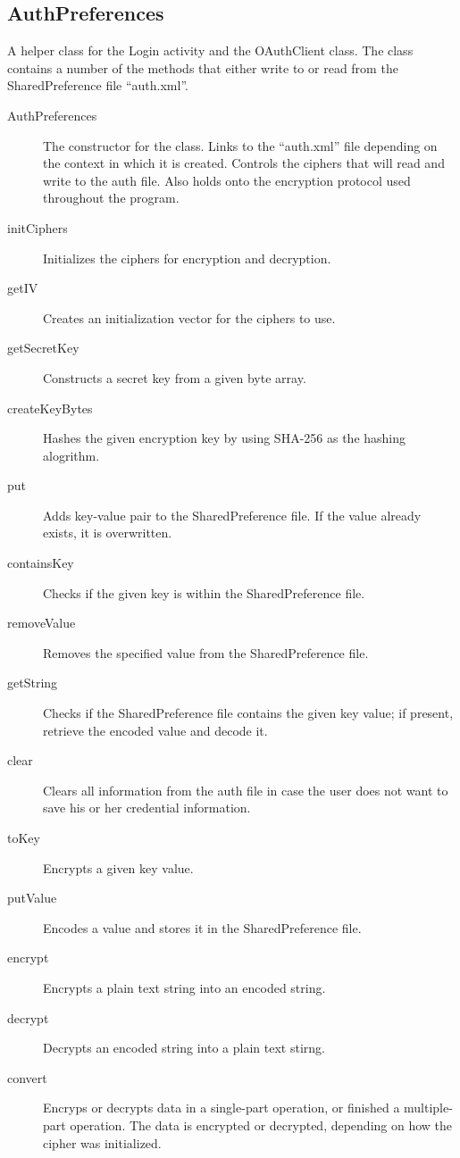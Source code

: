 \documentclass{article}
\begin{document}
\subsection{AuthPreferences}
A helper class for the Login activity and the OAuthClient class. The class contains a number of the methods that either write to or read from the SharedPreference file ``auth.xml''.
 \begin{description}
  \item[AuthPreferences] The constructor for the class. Links to the ``auth.xml'' file depending on the context in which it is created. Controls the ciphers that will read and write to the auth file. Also holds onto the encryption protocol used throughout the program.
  \item[initCiphers] Initializes the ciphers for encryption and decryption.
  \item[getIV] Creates an initialization vector for the ciphers to use.
  \item[getSecretKey] Constructs a secret key from a given byte array.
  \item[createKeyBytes] Hashes the given encryption key by using SHA-256 as the hashing alogrithm.
  \item[put] Adds key-value pair to the SharedPreference file. If the value already exists, it is overwritten.
  \item[containsKey] Checks if the given key is within the SharedPreference file.
  \item[removeValue] Removes the specified value from the SharedPreference file.
  \item[getString] Checks if the SharedPreference file contains the given key value; if present, retrieve the encoded value and decode it.
  \item[clear] Clears all information from the auth file in case the user does not want to save his or her credential information.
  \item[toKey] Encrypts a given key value.
  \item[putValue] Encodes a value and stores it in the SharedPreference file.
  \item[encrypt] Encrypts a plain text string into an encoded string.
  \item[decrypt] Decrypts an encoded string into a plain text stirng.
  \item[convert] Encryps or decrypts data in a single-part operation, or finished a multiple-part operation. The data is encrypted or decrypted, depending on how the cipher was initialized.
 \end{description}
\end{document}
